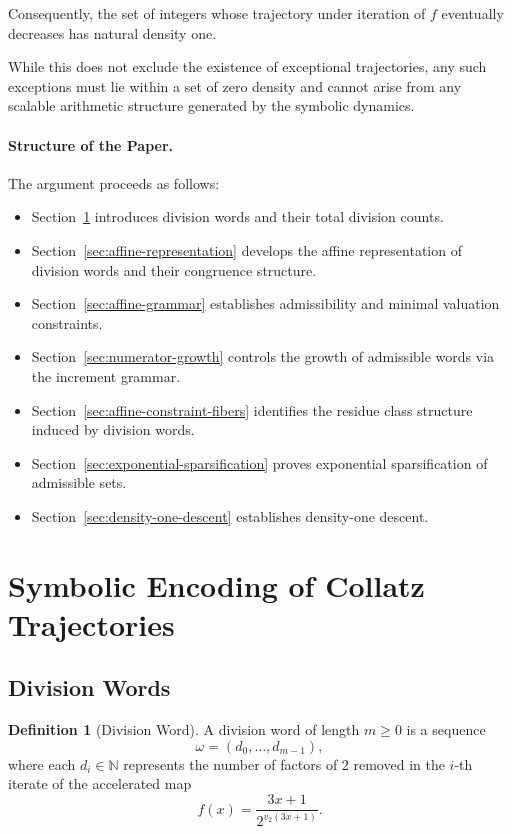 \documentclass[12pt, oneside]{article}
\numberwithin{equation}{section}
\theoremstyle{definition}
\newtheorem{definition}{Definition}[section]
\theoremstyle{plain}
\theoremstyle{remark}
\begin{document}
Consequently, the set of integers whose trajectory under iteration of $f$ eventually
decreases has natural density one.

While this does not exclude the existence of exceptional trajectories, any such
exceptions must lie within a set of zero density and cannot arise from any scalable
arithmetic structure generated by the symbolic dynamics.

\paragraph{Structure of the Paper.}
The argument proceeds as follows:
\begin{itemize}
\item Section~\ref{sec:division-counts} introduces division words and their total division counts.
\item Section~\ref{sec:affine-representation} develops the affine representation of division words and their congruence structure.
\item Section~\ref{sec:affine-grammar} establishes admissibility and minimal valuation constraints.
\item Section~\ref{sec:numerator-growth} controls the growth of admissible words via the increment grammar.
\item Section~\ref{sec:affine-constraint-fibers} identifies the residue class structure induced by division words.
\item Section~\ref{sec:exponential-sparsification} proves exponential sparsification of admissible sets.
\item Section~\ref{sec:density-one-descent} establishes density-one descent.
\end{itemize}

\section{Symbolic Encoding of Collatz Trajectories}
\label{sec:division-counts}

\subsection{Division Words}

\begin{definition}[Division Word]
A division word of length $m \ge 0$ is a sequence
\[
\omega = (d_0, \dots, d_{m-1}),
\]
where each $d_i \in \mathbb{N}$ represents the number of factors of $2$
removed in the $i$-th iterate of the accelerated map
\[
f(x) = \frac{3x+1}{2^{v_2(3x+1)}}.
\]
\end{definition}
\end{document}
